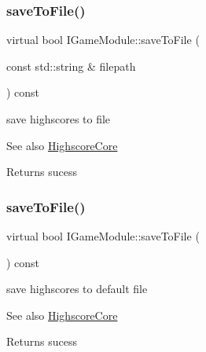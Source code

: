\subsubsection{\texorpdfstring{save\+To\+File()}{saveToFile()}\hspace{0.1cm}{\footnotesize\ttfamily [1/2]}}
{\footnotesize\ttfamily virtual bool I\+Game\+Module\+::save\+To\+File (\begin{DoxyParamCaption}\item[{const std\+::string \&}]{filepath }\end{DoxyParamCaption}) const\hspace{0.3cm}{\ttfamily [pure virtual]}}



save highscores to file 

\begin{DoxySeeAlso}{See also}
\hyperlink{class_highscore_core}{Highscore\+Core} 
\end{DoxySeeAlso}
\begin{DoxyReturn}{Returns}
sucess 
\end{DoxyReturn}
\mbox{\label{class_i_game_module_aa2db580e935b917bdcfbd480771d2e8a}} 
\subsubsection{\texorpdfstring{save\+To\+File()}{saveToFile()}\hspace{0.1cm}{\footnotesize\ttfamily [2/2]}}
{\footnotesize\ttfamily virtual bool I\+Game\+Module\+::save\+To\+File (\begin{DoxyParamCaption}{ }\end{DoxyParamCaption}) const\hspace{0.3cm}{\ttfamily [pure virtual]}}



save highscores to default file 

\begin{DoxySeeAlso}{See also}
\hyperlink{class_highscore_core}{Highscore\+Core} 
\end{DoxySeeAlso}
\begin{DoxyReturn}{Returns}
sucess 
\end{DoxyReturn}
\mbox{\label{class_i_game_module_ac4ca30b5a3fef73f213729baaaa98a46}} 
